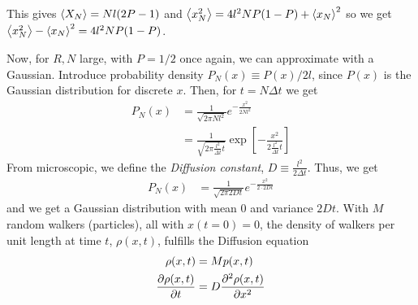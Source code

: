\documentclass[a4paper, english, 12pt]{article}
\begin{document}
\begin{multicols*}{2}
This gives $\expval{X_N}=Nl(2P-1)$ and $\expval{x_N^2}=4l^2 NP(1-P) + \expval{x_N}^2$ so we get $\expval{x_N^2} - \expval{x_N}^2 = 4l^2 N P(1-P)$.

Now, for $R,N$ large, with $P=1/2$ once again, we can approximate with a Gaussian. Introduce probability density $P_N(x)\equiv P(x)/2l$, since $P(x)$ is the Gaussian distribution for discrete $x$. Then, for $t=N\Delta t$ we get 
\begin{align*}
    P_N(x) &= \frac{1}{\sqrt{2\pi Nl^2}} e^{-\frac{x^2}{2Nl^2}} \\ 
    &= \frac{1}{\sqrt{2\pi \frac{l^2}{\Delta t} t}} \exp[-\frac{x^2}{2\frac{l^2}{\Delta t} t}]
\end{align*}  
From microscopic, we define the \textit{Diffusion constant}, $D\equiv \frac{l^2}{2\Delta t}$. Thus, we get 
\begin{align*}
    P_N(x) &= \frac{1}{\sqrt{2\pi 2Dt}} e^{-\frac{x^2}{2\cdot 2Dt}}
\end{align*}
and we get a Gaussian distribution with mean $0$ and variance $2Dt$. With $M$ random walkers (particles), all with $x(t=0)=0$, the density of walkers per unit length at time $t$, $\rho(x,t)$, fulfills the Diffusion equation 
\begin{align*}
    \rho(x,t) &= M p(x,t) \\ 
    \pdv{\rho(x,t)}{t} &= D \pdv[2]{\rho(x,t)}{x}
\end{align*}



\end{multicols*}
\end{document}
